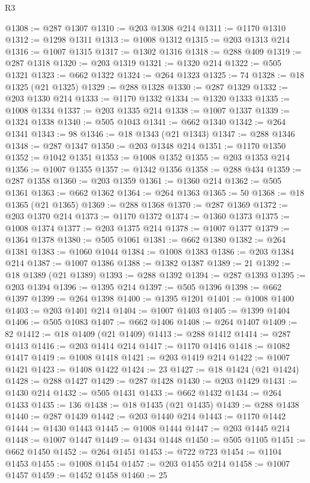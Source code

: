 \begin{lexlean}{R3}
\begin{coremodule}
@1308 := @287 @1307
@1310 := @203 @1308 @214
@1311 := @1170 @1310
@1312 := @1298 @1311
@1313 := @1008 @1312
@1315 := @203 @1313 @214
@1316 := @1007 @1315
@1317 := @1302 @1316
@1318 := @288 @409
@1319 := @287 @1318
@1320 := @203 @1319
@1321 := @1320 @214
@1322 := @505 @1321
@1323 := @662 @1322
@1324 := @264 @1323
@1325 := 74
@1328 := @18 @1325 (@21 @1325)
@1329 := @288 @1328
@1330 := @287 @1329
@1332 := @203 @1330 @214
@1333 := @1170 @1332
@1334 := @1320 @1333
@1335 := @1008 @1334
@1337 := @203 @1335 @214
@1338 := @1007 @1337
@1339 := @1324 @1338
@1340 := @505 @1043
@1341 := @662 @1340
@1342 := @264 @1341
@1343 := 98
@1346 := @18 @1343 (@21 @1343)
@1347 := @288 @1346
@1348 := @287 @1347
@1350 := @203 @1348 @214
@1351 := @1170 @1350
@1352 := @1042 @1351
@1353 := @1008 @1352
@1355 := @203 @1353 @214
@1356 := @1007 @1355
@1357 := @1342 @1356
@1358 := @288 @434
@1359 := @287 @1358
@1360 := @203 @1359
@1361 := @1360 @214
@1362 := @505 @1361
@1363 := @662 @1362
@1364 := @264 @1363
@1365 := 50
@1368 := @18 @1365 (@21 @1365)
@1369 := @288 @1368
@1370 := @287 @1369
@1372 := @203 @1370 @214
@1373 := @1170 @1372
@1374 := @1360 @1373
@1375 := @1008 @1374
@1377 := @203 @1375 @214
@1378 := @1007 @1377
@1379 := @1364 @1378
@1380 := @505 @1061
@1381 := @662 @1380
@1382 := @264 @1381
@1383 := @1060 @1044
@1384 := @1008 @1383
@1386 := @203 @1384 @214
@1387 := @1007 @1386
@1388 := @1382 @1387
@1389 := 21
@1392 := @18 @1389 (@21 @1389)
@1393 := @288 @1392
@1394 := @287 @1393
@1395 := @203 @1394
@1396 := @1395 @214
@1397 := @505 @1396
@1398 := @662 @1397
@1399 := @264 @1398
@1400 := @1395 @1201
@1401 := @1008 @1400
@1403 := @203 @1401 @214
@1404 := @1007 @1403
@1405 := @1399 @1404
@1406 := @505 @1083
@1407 := @662 @1406
@1408 := @264 @1407
@1409 := 82
@1412 := @18 @1409 (@21 @1409)
@1413 := @288 @1412
@1414 := @287 @1413
@1416 := @203 @1414 @214
@1417 := @1170 @1416
@1418 := @1082 @1417
@1419 := @1008 @1418
@1421 := @203 @1419 @214
@1422 := @1007 @1421
@1423 := @1408 @1422
@1424 := 23
@1427 := @18 @1424 (@21 @1424)
@1428 := @288 @1427
@1429 := @287 @1428
@1430 := @203 @1429
@1431 := @1430 @214
@1432 := @505 @1431
@1433 := @662 @1432
@1434 := @264 @1433
@1435 := 136
@1438 := @18 @1435 (@21 @1435)
@1439 := @288 @1438
@1440 := @287 @1439
@1442 := @203 @1440 @214
@1443 := @1170 @1442
@1444 := @1430 @1443
@1445 := @1008 @1444
@1447 := @203 @1445 @214
@1448 := @1007 @1447
@1449 := @1434 @1448
@1450 := @505 @1105
@1451 := @662 @1450
@1452 := @264 @1451
@1453 := @722 @723
@1454 := @1104 @1453
@1455 := @1008 @1454
@1457 := @203 @1455 @214
@1458 := @1007 @1457
@1459 := @1452 @1458
@1460 := 25

\end{coremodule}
\end{lexlean}
